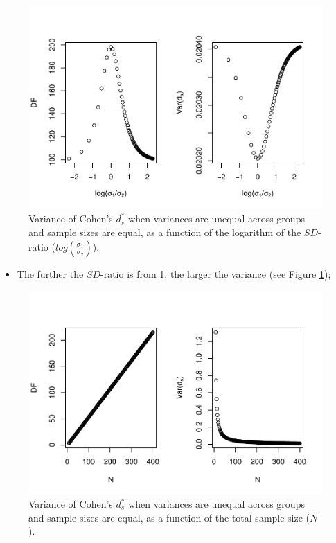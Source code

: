 \documentclass[
  english,
  man]{apa6}
\providecommand{\tightlist}{%
  \setlength{\itemsep}{0pt}\setlength{\parskip}{0pt}}
\begin{document}
\begin{figure}
\centering
\includegraphics{Theoretical-Variance-of-all-estimators-as-a-function-of-population-parameters_files/figure-latex/varcohendprimehetbalSDratio2-1.pdf}
\caption{\label{fig:varcohendprimehetbalSDratio2}Variance of Cohen's \(d^*_s\) when variances are unequal across groups and sample sizes are equal, as a function of the logarithm of the \(SD\)-ratio (\(log \left( \frac{\sigma_1}{\sigma_2} \right)\)).}
\end{figure}

\begin{itemize}
\tightlist
\item
  The further the \(SD\)-ratio is from 1, the larger the variance (see Figure \ref{fig:varcohendprimehetbalSDratio2});
\end{itemize}

\begin{figure}
\centering
\includegraphics{Theoretical-Variance-of-all-estimators-as-a-function-of-population-parameters_files/figure-latex/varcohendprimehetbalNsize2-1.pdf}
\caption{\label{fig:varcohendprimehetbalNsize2}Variance of Cohen's \(d^*_s\) when variances are unequal across groups and sample sizes are equal, as a function of the total sample size (\(N\)).}
\end{figure}
\end{document}
